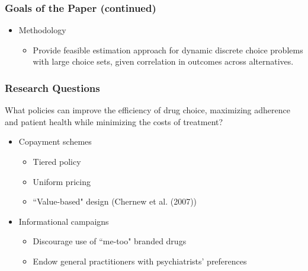 \documentclass[aspectratio=169,11pt]{beamer}
\begin{document}

\begin{frame}
\frametitle{Goals of the Paper (continued)}

\begin{itemize}
\item Methodology

\begin{itemize}
\item Provide feasible estimation approach for dynamic discrete choice
problems with large choice sets, given correlation in outcomes across
alternatives.
\end{itemize}
\end{itemize}
\end{frame}




\begin{frame}
\frametitle{Research Questions}

What policies can improve the efficiency of drug choice, maximizing
adherence and patient health while minimizing the costs of treatment?

\begin{itemize}
\item Copayment schemes

\begin{itemize}
\item Tiered policy

\item Uniform pricing

\item ``Value-based" design (Chernew et al. (2007))
\end{itemize}

\item Informational campaigns

\begin{itemize}
\item Discourage use of ``me-too" branded drugs

\item Endow general practitioners with psychiatrists' preferences
\end{itemize}
\end{itemize}
\end{frame}

\end{document}
